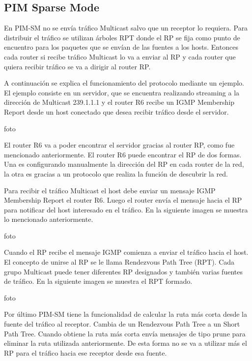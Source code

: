 \documentclass[12pt,a4paper,oneside]{book}
\begin{document}
\subsection{PIM Sparse Mode}
\label{pimsm}

En PIM-SM no se envía tráfico Multicast salvo que un receptor lo requiera. Para distribuir el tráfico se utilizan árboles RPT donde el RP se fija como punto de encuentro para los paquetes que se envían de las fuentes a los hosts. Entonces cada router si recibe tráfico Multicast lo va a enviar al RP y cada router que quiera recibir tráfico se va a dirigir al router RP.

\vspace{0.5cm}

A continuación se explica el funcionamiento del protocolo mediante un ejemplo. El ejemplo consiste en un servidor, que se encuentra realizando streaming a la dirección de Multicast 239.1.1.1 y el router R6 recibe un IGMP Membership Report desde un host conectado que desea recibir tráfico desde el servidor.

foto

El router R6 va a poder encontrar el servidor gracias al router RP, como fue mencionado anteriormente. El router R6 puede encontrar el RP de dos formas. Una es configurando manualmente la dirección del RP en cada router de la red, la otra es gracias a un protocolo que realiza la función de descubrir la red.  

\vspace{0.5cm}

Para recibir el tráfico Multicast el host debe enviar un mensaje IGMP Membership Report el router R6. Luego el router envía el mensaje hacia el RP para notificar del host interesado en el tráfico. En la siguiente imagen se muestra lo mencionado anteriormente.

foto

Cuando el RP recibe el mensaje IGMP comienza a enviar el tráfico hacia el host. El concepto de unirse al RP se le llama Rendezvous Path Tree (RPT). Cada grupo Multicast puede tener diferentes RP designados y también varias fuentes de tráfico. En la siguiente imagen se muestra el RPT formado.

foto

Por último PIM-SM tiene la funcionalidad de calcular la ruta más corta desde la fuente del tráfico al receptor. Cambia de un Rendezvous Path Tree a un Short Path Tree. Cuando obtiene la ruta más corta envía mensajes de tipo prune para eliminar la ruta utilizada anteriormente. De esta forma no se va a utilizar más el RP para el tráfico hacia ese receptor desde esa fuente.
\end{document}
